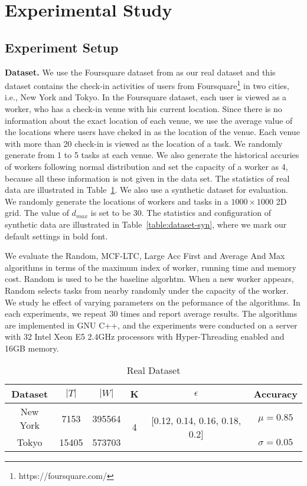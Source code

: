 \section{Experimental Study}
\label{sec:experiment}

\subsection{Experiment Setup}

\textbf{Dataset.}
We use the Foursquare dataset from \cite{yang2014modeling} as our real dataset and 
this dataset contains the check-in activities of users from Foursquare\footnote{https://foursquare.com/} in two cities, i.e., New York and Tokyo.
In the Foursquare dataset, each user is viewed as a worker, who has a check-in venue with his current location. 
Since there is no information about the exact location of each venue, 
we use the average value of the locations where users have cheked in as the location of the venue.
Each venue with more than 20 check-in is viewed as the location of a task.
We randomly generate from 1 to 5 tasks at each venue.
We also generate the historical accuries of workers following normal distribution and set the capacity of a worker as 4,
because all these information is not given in the data set.
The statistics of real data are illustrated in Table~\ref{table:dataset-real}.
We also use a synthetic dataset for evaluation. 
We randomly generate the locations of workers and tasks in a $1000 \times 1000$ 2D grid.
The value of $d_{max}$ is set to be 30. 
The statistics and configuration of synthetic data are illustrated in Table~\ref{table:dataset-syn}, where we mark our default settings in bold font.

We evaluate the Random, MCF-LTC, Large Acc First and Average And Max algorithms in terms of 
the maximum index of worker, running time and memory cost. 
Random is used to be the baseline algorhtm. 
When a new worker appears, Random selects tasks from nearby randomly under the capacity of the worker.
We study he effect of varying parameters on the peformance of the algorithms.
In each experiments, we repeat 30 times and report average results.
The algorithms are implemented in GNU C++, and the experiments were conducted on a server with 32 Intel
Xeon E5 2.4GHz processors with Hyper-Threading enabled and 16GB memory.

\begin{table}
	\centering
	\caption{Real Dataset}
	\vspace{-1ex}
	\label{table:dataset-real}
	\begin{tabular}{|c|c|c|c|c|c|}
		\hline
		Dataset & $|T|$ & $|W|$ & K & $\epsilon$ & Accuracy \\
		\hline
		New York & 7153 & 395564 & \multirow{2}{*}{4} & \multirow{2}{*}{[0.12, 0.14, 0.16, 0.18, 0.2]} &$\mu = 0.85$ \\
		\cline{1-3}
		Tokyo	& 15405 & 573703 & & &$\sigma = 0.05$ \\
		\hline
	\end{tabular}
\end{table}

